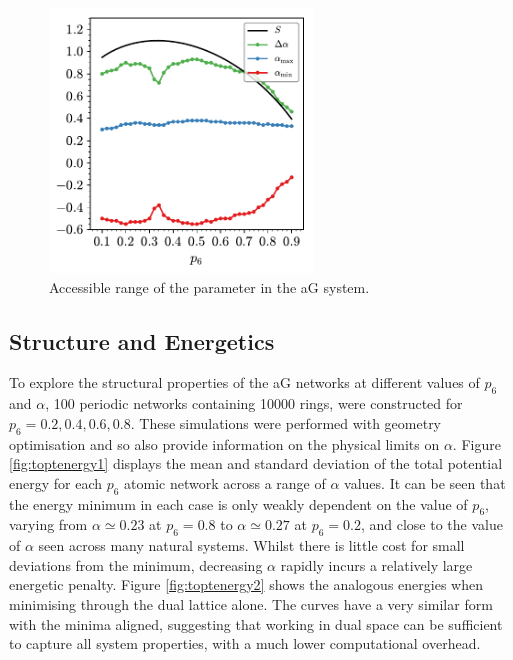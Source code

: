 \begin{figure}[bt]
	\centering
	\includegraphics[width=7cm]{./figures/targeted_opt/topt_alpha_limits.pdf}
	\caption{Accessible range of the \aw{} parameter in the aG system.%
	}
	\label{fig:alphalim}
\end{figure}


\subsection{Structure and Energetics}

To explore the structural properties of the aG networks at different values of $p_6$ and $\alpha$, 100 periodic networks containing 10000 rings, were constructed for $p_6=0.2,0.4,0.6,0.8$. 
These simulations were performed with geometry optimisation and so also provide information on the physical limits on $\alpha$.
Figure \ref{fig:toptenergy1} displays the mean and standard deviation of the total potential energy for each $p_6$ atomic network across a range of $\alpha$ values. 
It can be seen that the energy minimum in each case is only weakly dependent on the value of $p_6$, varying from $\alpha\simeq{0.23}$ at $p_6=0.8$ to $\alpha\simeq{0.27}$ at $p_6=0.2$, and close to the value of $\alpha$ seen across many natural systems. 
Whilst there is little cost for small deviations from the minimum, decreasing $\alpha$ rapidly incurs a relatively large energetic penalty. 
Figure \ref{fig:toptenergy2} shows the analogous energies when minimising through the dual lattice alone. 
The curves have a very similar form with the minima aligned, suggesting that working in dual space can be sufficient to capture all system properties, with a much lower computational overhead.


